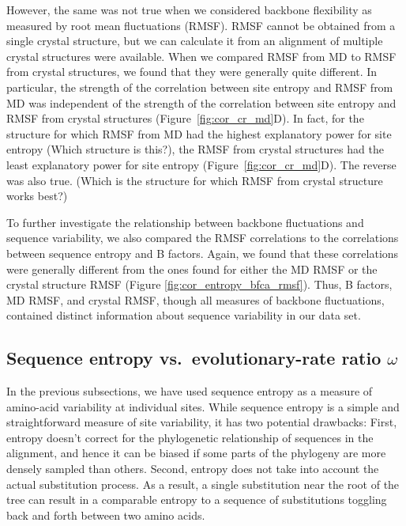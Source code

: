 \documentclass[12pt]{article}
\begin{document}
However, the same was not true when we considered backbone flexibility as measured by root mean fluctuations (RMSF). RMSF cannot be obtained from a single crystal structure, but we can calculate it from an alignment of multiple crystal structures were available. When we compared RMSF from MD to RMSF from crystal structures, we found that they were generally quite different. In particular, the strength of the correlation between site entropy and RMSF from MD was independent of the strength of the correlation between site entropy and RMSF from crystal structures (Figure~\ref{fig:cor_cr_md}D). In fact, for the structure for which RMSF from MD had the highest explanatory power for site entropy {\color{red}(Which structure is this?)}, the RMSF from crystal structures had the least explanatory power for site entropy (Figure~\ref{fig:cor_cr_md}D). The reverse was also true. {\color{red}(Which is the structure for which RMSF from crystal structure works best?)}

To further investigate the relationship between backbone fluctuations and sequence variability, we also compared the RMSF correlations to the correlations between sequence entropy and B factors. Again, we found that these correlations were generally different from the ones found for either the MD RMSF or the crystal structure RMSF (Figure \ref{fig:cor_entropy_bfca_rmsf}). Thus, B factors, MD RMSF, and crystal RMSF, though all measures of backbone fluctuations, contained distinct information about sequence variability in our data set.

\subsection*{Sequence entropy vs.\ evolutionary-rate ratio $\omega$}

In the previous subsections, we have used sequence entropy as a measure of amino-acid variability at individual sites. While sequence entropy is a simple and straightforward measure of site variability, it has two potential drawbacks: First, entropy doesn't correct for the phylogenetic relationship of sequences in the alignment, and hence it can be biased if some parts of the phylogeny are more densely sampled than others. Second, entropy does not take into account the actual substitution process. As a result, a single substitution near the root of the tree can result in a comparable entropy to a sequence of substitutions toggling back and forth between two amino acids.
\end{document}
